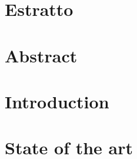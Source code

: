 \documentclass[12pt,a4paper,twoside,openright]{report}
\makeatletter
\def\cleardoublepage{\clearpage\if@twoside \ifodd\c@page\else
\hbox{}
\vspace*{\fill}
\begin{center}
\end{center}
\vspace{\fill}
\thispagestyle{empty}
\newpage
\if@twocolumn\hbox{}\newpage\fi\fi\fi}
\makeatother
\begin{document}
\setcounter{page}{1}
\pagestyle{empty}



\pagestyle{fancy}
\renewcommand{\contentsname}{Table of Contents}%

\chapter*{Estratto}


\chapter*{Abstract}


\tableofcontents
\cleardoublepage
\listoffigures
\listoftables
\listofalgorithms


\setcounter{page}{1}

\chapter{Introduction}
\label{chap:one}


\chapter{State of the art}
\label{chap:sota}

\end{document}

